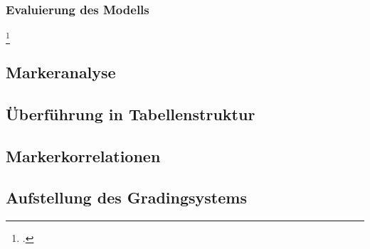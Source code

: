 \subsubsection{Evaluierung des Modells}
\footcite[]{tsai2006}

\subsection{Markeranalyse}
\subsection{Überführung in Tabellenstruktur}
\subsection{Markerkorrelationen}
\subsection{Aufstellung des Gradingsystems}
